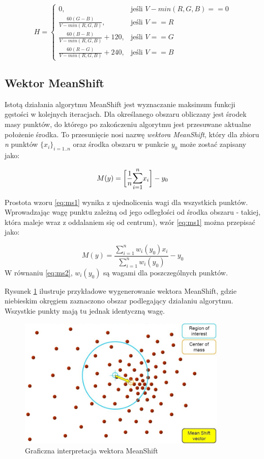 \begin{equation}
\label{HSV_last}
H=\begin{cases}
	0, & \text{jeśli } V-min(R,G,B)==0 \\
	\frac{60(G-B)}{V-min(R,G,B)}, & \text{jeśli } V==R \\
	\frac{60(B-R)}{V-min(R,G,B)}+120, & \text{jeśli } V==G \\
	\frac{60(R-G)}{V-min(R,G,B)}+240, & \text{jeśli } V==B 
\end{cases}
\end{equation}

\subsection{Wektor MeanShift}
\label{ssec:MS}
Istotą działania algorytmu MeanShift jest wyznaczanie maksimum funkcji gęstości w kolejnych iteracjach. Dla określanego obszaru obliczany jest środek masy punktów, do którego po zakończeniu algorytmu jest przesuwane aktualne położenie środka. To przesunięcie nosi nazwę \textit{wektora MeanShift}, który dla zbioru \textit{n} punktów $\{x_{i}\}_{i=1..n}$ oraz środka obszaru w punkcie $y_0$ może zostać zapisany jako:

\begin{equation}
\label{eq:ms1}
M(y)=\bigg[\frac{1}{n}\mathlarger{\sum\limits_{i=1}^{n}}x_i\bigg]-y_0
\end{equation}

Prostota wzoru \ref{eq:ms1} wynika z ujednolicenia wagi dla wszystkich punktów. Wprowadzając wagę punktu zależną od jego odległości od środka obszaru - takiej, która maleje wraz z oddalaniem się od centrum), wzór \ref{eq:ms1} można przepisać jako:

\begin{equation}
\label{eq:ms2}
M(y)=\frac{\sum_{i=1}^{n}w_i(y_0)x_i}{\sum_{i=1}^{n}w_i(y_0)}-y_0
\end{equation}
W równaniu \ref{eq:ms2}, $w_i(y_0)$ są wagami dla poszczególnych punktów.

Rysunek  \ref{fig:ms_vector} ilustruje przykładowe wygenerowanie wektora MeanShift, gdzie niebieskim okręgiem zaznaczono obszar podlegający działaniu algorytmu. Wszystkie punkty mają tu jednak identyczną wagę.
\begin{figure}[h]
	\centering
	\includegraphics[width=10cm]{2_meanshift.jpg}
	\caption{Graficzna interpretacja wektora MeanShift \cite{Egorov}}
	\label{fig:ms_vector}
\end{figure}

